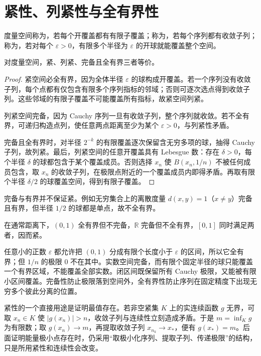 \documentclass[UTF8,12pt,a4paper,fontset=fandol]{ctexbook}
\begin{document}
\section{紧性、列紧性与全有界性}
\begin{definition}
度量空间称为，若每个开覆盖都有有限子覆盖；称为，若每个序列都有收敛子列；称为，若对每个 $\varepsilon>0$，有限多个半径为 $\varepsilon$ 的开球就能覆盖整个空间。
\end{definition}
\begin{theorem}\label{thm:fa-metric-compactness}
对度量空间，紧、列紧、完备且全有界三者等价。
\end{theorem}
\begin{proof}
紧空间必全有界，因为全体半径 $\varepsilon$ 的球构成开覆盖。若一个序列没有收敛子列，每个点都有仅包含有限多个序列指标的邻域；否则可逐次选点得到收敛子列。这些邻域的有限子覆盖不可能覆盖所有指标，故紧空间列紧。

列紧空间完备，因为 Cauchy 序列一旦有收敛子列，整个序列就收敛。若不全有界，可递归构造点列，使任意两点距离至少为某个 $\varepsilon>0$，与列紧性矛盾。

完备且全有界时，对半径 $2^{-k}$ 的有限覆盖逐次保留含无穷多项的球，抽得 Cauchy 子列，故列紧。最后，列紧空间的任意开覆盖具有 Lebesgue 数：存在 $\delta>0$，每个半径 $\delta$ 的球都包含于某个覆盖成员。否则选择 $x_n$ 使 $B(x_n,1/n)$ 不被任何成员包含，取 $x_n$ 的收敛子列，在极限点附近的一个覆盖成员内即得矛盾。再取有限个半径 $\delta/2$ 的球覆盖空间，得到有限子覆盖。
\end{proof}
完备与有界并不保证紧。例如无穷集合上的离散度量 $d(x,y)=1$（$x\ne y$）完备且有界，但半径 $1/2$ 的球都是单点，故不全有界。

\begin{example}[三种条件分别控制什么]
在通常距离下，$(0,1)$ 全有界但不完备，$\mathbb R$ 完备但不全有界，$[0,1]$ 同时满足两者，因而紧。
\end{example}
\begin{solve}
任意小的正数 $\varepsilon$ 都允许把 $(0,1)$ 分成有限个长度小于 $\varepsilon$ 的区间，所以它全有界；但 $1/n$ 的极限 $0$ 不在其中。实数空间完备，而有限个固定半径的球只能覆盖一个有界区域，不能覆盖全部实数。闭区间既保留所有 Cauchy 极限，又能被有限小区间覆盖。完备性防止极限落到空间外，全有界性防止序列在固定精度下出现无穷多个彼此分离的位置。
\end{solve}

紧性的一个直接用途是证明最值存在。若非空紧集 $K$ 上的实连续函数 $g$ 无界，可取 $x_n\in K$ 使 $|g(x_n)|>n$，收敛子列与连续性立刻造成矛盾。于是 $m=\inf_Kg$ 为有限数；取 $g(x_n)\to m$，再提取收敛子列 $x_{n_k}\to x_*$，便有 $g(x_*)=m$。后面证明能量极小点存在时，仍采用“取极小化序列、提取子列、传递极限”的结构，只是所用紧性和连续性会改变。
\end{document}
